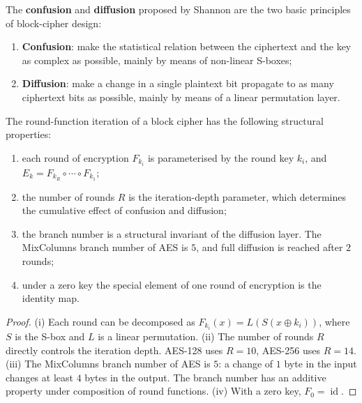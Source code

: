\begin{definition}\label{def:confusion_diffusion}
The \textbf{confusion} and \textbf{diffusion} proposed by Shannon are the two basic principles of block-cipher design:
\begin{enumerate}[label=(\roman*)]
    \item \textbf{Confusion}: make the statistical relation between the ciphertext and the key as complex as possible, mainly by means of non-linear S-boxes;
    \item \textbf{Diffusion}: make a change in a single plaintext bit propagate to as many ciphertext bits as possible, mainly by means of a linear permutation layer.
\end{enumerate}
\end{definition}

\begin{proposition}\label{prop:block_cipher_iteration_structure}
The round-function iteration of a block cipher has the following structural properties:
\begin{enumerate}[label=(\roman*)]
    \item each round of encryption \(F_{k_i}\) is parameterised by the round key \(k_i\), and \(E_k=F_{k_R}\circ\cdots\circ F_{k_1}\);
    \item the number of rounds \(R\) is the iteration-depth parameter, which determines the cumulative effect of confusion and diffusion;
    \item the branch number is a structural invariant of the diffusion layer. The MixColumns branch number of AES is \(5\), and full diffusion is reached after \(2\) rounds;
    \item under a zero key the special element of one round of encryption is the identity map.
\end{enumerate}
\end{proposition}

\begin{proof}
(i) Each round can be decomposed as \(F_{k_i}(x)=L(S(x\oplus k_i))\), where \(S\) is the S-box and \(L\) is a linear permutation.
(ii) The number of rounds \(R\) directly controls the iteration depth. AES-128 uses \(R=10\), AES-256 uses \(R=14\).
(iii) The MixColumns branch number of AES is \(5\): a change of \(1\) byte in the input changes at least \(4\) bytes in the output. The branch number has an additive property under composition of round functions.
(iv) With a zero key, \(F_0=\operatorname{id}\).
\end{proof}

